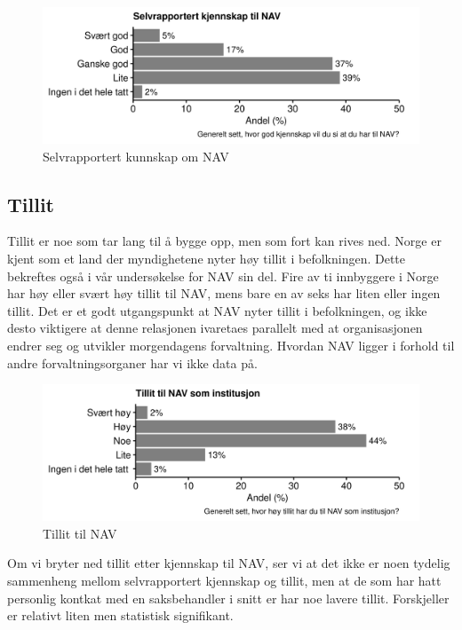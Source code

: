 \documentclass[
  12pt,
  a4paper, 12pt]{article}
\begin{document}
\begin{figure}

{\centering \includegraphics[width=0.8\linewidth]{figs/png/fig_nav_knowledge} 

}

\caption{Selvrapportert kunnskap om NAV}\label{fig:unnamed-chunk-5}
\end{figure}

\hypertarget{tillit}{%
\subsection{Tillit}\label{tillit}}

Tillit er noe som tar lang til å bygge opp, men som fort kan rives ned.
Norge er kjent som et land der myndighetene nyter høy tillit i befolkningen.
Dette bekreftes også i vår undersøkelse for NAV sin del.
Fire av ti innbyggere i Norge har høy eller svært høy tillit til NAV, mens bare en av seks har liten eller ingen tillit.
Det er et godt utgangspunkt at NAV nyter tillit i befolkningen, og ikke desto viktigere at denne relasjonen ivaretaes parallelt med at organisasjonen endrer seg og utvikler morgendagens forvaltning.
Hvordan NAV ligger i forhold til andre forvaltningsorganer har vi ikke data på.

\begin{figure}

{\centering \includegraphics[width=0.8\linewidth]{figs/png/fig_nav_trust} 

}

\caption{Tillit til NAV}\label{fig:unnamed-chunk-6}
\end{figure}

Om vi bryter ned tillit etter kjennskap til NAV, ser vi at det ikke er noen tydelig sammenheng mellom selvrapportert kjennskap og tillit, men at de som har hatt personlig kontkat med en saksbehandler i snitt er har noe lavere tillit. Forskjeller er relativt liten men statistisk signifikant.
\end{document}
